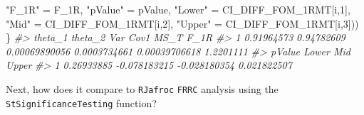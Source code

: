 \documentclass[
]{book}
\newenvironment{Shaded}{\begin{snugshade}}{\end{snugshade}}
\newcommand{\CommentTok}[1]{\textcolor[rgb]{0.56,0.35,0.01}{\textit{#1}}}
\newcommand{\DecValTok}[1]{\textcolor[rgb]{0.00,0.00,0.81}{#1}}
\newcommand{\NormalTok}[1]{#1}
\newcommand{\StringTok}[1]{\textcolor[rgb]{0.31,0.60,0.02}{#1}}
\begin{document}
\begin{Shaded}
\begin{Highlighting}[]
                   \StringTok{"F\_1R"}\NormalTok{ =}\StringTok{ }\NormalTok{F\_1R, }
                   \StringTok{"pValue"}\NormalTok{ =}\StringTok{ }\NormalTok{pValue,}
                   \StringTok{"Lower"}\NormalTok{ =}\StringTok{ }\NormalTok{CI\_DIFF\_FOM\_1RMT[i,}\DecValTok{1}\NormalTok{], }
                   \StringTok{"Mid"}\NormalTok{ =}\StringTok{ }\NormalTok{CI\_DIFF\_FOM\_1RMT[i,}\DecValTok{2}\NormalTok{], }
                   \StringTok{"Upper"}\NormalTok{ =}\StringTok{ }\NormalTok{CI\_DIFF\_FOM\_1RMT[i,}\DecValTok{3}\NormalTok{]))}
\NormalTok{\}}
\CommentTok{\#\textgreater{}      theta\_1    theta\_2           Var         Cov1          MS\_T      F\_1R}
\CommentTok{\#\textgreater{} 1 0.91964573 0.94782609 0.00069890056 0.0003734661 0.00039706618 1.2201111}
\CommentTok{\#\textgreater{}       pValue        Lower          Mid       Upper}
\CommentTok{\#\textgreater{} 1 0.26933885 {-}0.078183215 {-}0.028180354 0.021822507}
\end{Highlighting}
\end{Shaded}

Next, how does it compare to \texttt{RJafroc} \texttt{FRRC} analysis using the \texttt{StSignificanceTesting} function?
\end{document}
